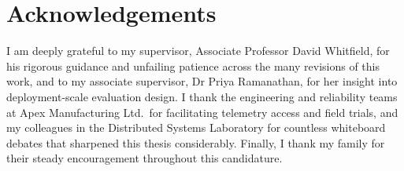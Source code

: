 \chapter*{Acknowledgements}
I am deeply grateful to my supervisor, Associate Professor David Whitfield, for his rigorous
guidance and unfailing patience across the many revisions of this work, and to my associate
supervisor, Dr Priya Ramanathan, for her insight into deployment-scale evaluation design. I
thank the engineering and reliability teams at Apex Manufacturing Ltd.\ for facilitating
telemetry access and field trials, and my colleagues in the Distributed Systems Laboratory for
countless whiteboard debates that sharpened this thesis considerably. Finally, I thank my
family for their steady encouragement throughout this candidature.

\tableofcontents
\listoffigures
\listoftables



